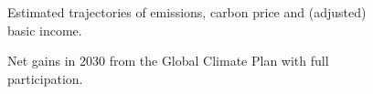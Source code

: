 \documentclass[12pt,english]{article}
\begin{document}
\begin{figure}[h!]
    \caption{Estimated trajectories of emissions, carbon price and (adjusted) basic income.}\label{fig:trajectory}
\end{figure}

\begin{figure}[h!]
    \caption{Net gains in 2030 from the Global Climate Plan with full participation.}\label{fig:median_gain_2015}
\end{figure}
\end{document}
